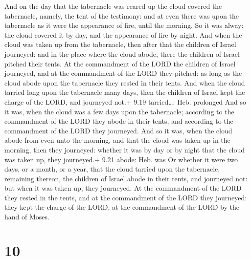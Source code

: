  And on the day that the tabernacle was reared up the
cloud covered the tabernacle, namely, the tent of the testimony: and at
even there was upon the tabernacle as it were the appearance of fire,
until the morning.  So it was alway: the cloud covered it
by day, and the appearance of fire by night.  And when the
cloud was taken up from the tabernacle, then after that the children of
Israel journeyed: and in the place where the cloud abode, there the
children of Israel pitched their tents.  At the commandment
of the LORD the children of Israel journeyed, and at the commandment of
the LORD they pitched: as long as the cloud abode upon the tabernacle
they rested in their tents.  And when the cloud tarried
long upon the tabernacle many days, then the children of Israel kept the
charge of the LORD, and journeyed not.+ 9.19 tarried\ldots: Heb.
prolonged  And so it was, when the cloud was a few days
upon the tabernacle; according to the commandment of the LORD they abode
in their tents, and according to the commandment of the LORD they
journeyed.  And so it was, when the cloud abode from even
unto the morning, and that the cloud was taken up in the morning, then
they journeyed: whether it was by day or by night that the cloud was
taken up, they journeyed.+ 9.21 abode: Heb. was  Or whether
it were two days, or a month, or a year, that the cloud tarried upon the
tabernacle, remaining thereon, the children of Israel abode in their
tents, and journeyed not: but when it was taken up, they journeyed.
 At the commandment of the LORD they rested in the tents,
and at the commandment of the LORD they journeyed: they kept the charge
of the LORD, at the commandment of the LORD by the hand of Moses.

\hypertarget{section-9}{%
\section{10}\label{section-9}}

